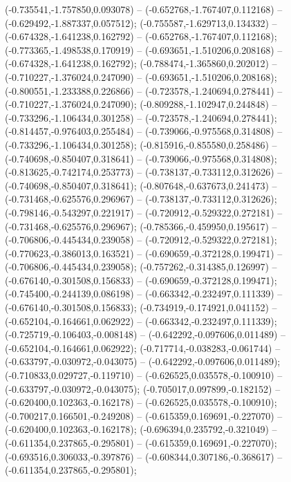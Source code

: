  (-0.735541,-1.757850,0.093078) -- (-0.652768,-1.767407,0.112168) -- (-0.629492,-1.887337,0.057512);
 (-0.755587,-1.629713,0.134332) -- (-0.674328,-1.641238,0.162792) -- (-0.652768,-1.767407,0.112168);
 (-0.773365,-1.498538,0.170919) -- (-0.693651,-1.510206,0.208168) -- (-0.674328,-1.641238,0.162792);
 (-0.788474,-1.365860,0.202012) -- (-0.710227,-1.376024,0.247090) -- (-0.693651,-1.510206,0.208168);
 (-0.800551,-1.233388,0.226866) -- (-0.723578,-1.240694,0.278441) -- (-0.710227,-1.376024,0.247090);
 (-0.809288,-1.102947,0.244848) -- (-0.733296,-1.106434,0.301258) -- (-0.723578,-1.240694,0.278441);
 (-0.814457,-0.976403,0.255484) -- (-0.739066,-0.975568,0.314808) -- (-0.733296,-1.106434,0.301258);
 (-0.815916,-0.855580,0.258486) -- (-0.740698,-0.850407,0.318641) -- (-0.739066,-0.975568,0.314808);
 (-0.813625,-0.742174,0.253773) -- (-0.738137,-0.733112,0.312626) -- (-0.740698,-0.850407,0.318641);
 (-0.807648,-0.637673,0.241473) -- (-0.731468,-0.625576,0.296967) -- (-0.738137,-0.733112,0.312626);
 (-0.798146,-0.543297,0.221917) -- (-0.720912,-0.529322,0.272181) -- (-0.731468,-0.625576,0.296967);
 (-0.785366,-0.459950,0.195617) -- (-0.706806,-0.445434,0.239058) -- (-0.720912,-0.529322,0.272181);
 (-0.770623,-0.386013,0.163521) -- (-0.690659,-0.372128,0.199471) -- (-0.706806,-0.445434,0.239058);
 (-0.757262,-0.314385,0.126997) -- (-0.676140,-0.301508,0.156833) -- (-0.690659,-0.372128,0.199471);
 (-0.745400,-0.244139,0.086198) -- (-0.663342,-0.232497,0.111339) -- (-0.676140,-0.301508,0.156833);
 (-0.734919,-0.174921,0.041152) -- (-0.652104,-0.164661,0.062922) -- (-0.663342,-0.232497,0.111339);
 (-0.725719,-0.106403,-0.008148) -- (-0.642292,-0.097606,0.011489) -- (-0.652104,-0.164661,0.062922);
 (-0.717714,-0.038283,-0.061744) -- (-0.633797,-0.030972,-0.043075) -- (-0.642292,-0.097606,0.011489);
 (-0.710833,0.029727,-0.119710) -- (-0.626525,0.035578,-0.100910) -- (-0.633797,-0.030972,-0.043075);
 (-0.705017,0.097899,-0.182152) -- (-0.620400,0.102363,-0.162178) -- (-0.626525,0.035578,-0.100910);
 (-0.700217,0.166501,-0.249208) -- (-0.615359,0.169691,-0.227070) -- (-0.620400,0.102363,-0.162178);
 (-0.696394,0.235792,-0.321049) -- (-0.611354,0.237865,-0.295801) -- (-0.615359,0.169691,-0.227070);
 (-0.693516,0.306033,-0.397876) -- (-0.608344,0.307186,-0.368617) -- (-0.611354,0.237865,-0.295801);
